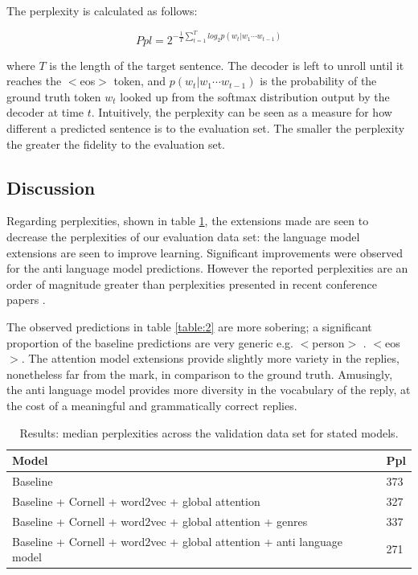 \documentclass[%
 reprint,
 amsmath,amssymb,
 aps,
]{revtex4-1}
\begin{document}
The perplexity is calculated as follows:

\begin{equation}
Ppl = 2^{-\frac{1}{T} \sum^{T}_{t=1} log_{2}p(w_t | w_1 \cdots w_{t-1})}
\end{equation}

where $T$ is the length of the target sentence. The decoder is left to unroll until it reaches the $<$eos$>$ token, and $p(w_t | w_1 \cdots w_{t-1})$ is the probability of the ground truth token $w_t$ looked up from the softmax distribution output by the decoder at time $t$. Intuitively, the perplexity can be seen as a measure for how different a predicted sentence is to the evaluation set. The smaller the perplexity the greater the fidelity to the evaluation set.


\subsection{\label{sec:level2}Discussion}

Regarding perplexities, shown in table \ref{table:1}, the extensions made are seen to decrease the perplexities of our evaluation data set: the language model extensions are seen to improve learning. Significant improvements were observed for the anti language model predictions. However the reported perplexities are an order of magnitude greater than perplexities presented in recent conference papers \cite{antilm} \cite{persona}. 

The observed predictions in table \ref{table:2} are more sobering; a significant proportion of the baseline predictions are very generic e.g. $<$person$>$ . $<$eos$>$. The attention model extensions provide slightly more variety in the replies, nonetheless far from the mark, in comparison to the ground truth. Amusingly, the anti language model provides more diversity in the vocabulary of the reply, at the cost of a meaningful and grammatically correct replies.

\begin{table}[h!]
\centering
\begin{tabular}{| m{20em} | m{1cm}| } 
 \hline
 Model & Ppl \\ [0.5ex] 
 \hline
 Baseline & 373  \\ 
 \hline
 Baseline + Cornell + word2vec + global attention & 327  \\ 
 \hline
 Baseline + Cornell + word2vec + global attention + genres & 337 \\ [1ex] 
 \hline
 Baseline + Cornell + word2vec + global attention + anti language model & 271 \\ 
 \hline
\end{tabular}
\caption{Results: median perplexities across the validation data set for stated models.}
\label{table:1}
\end{table}
\end{document}
